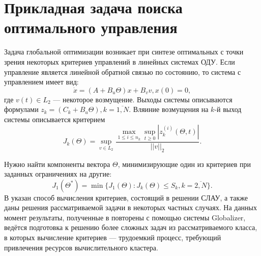 \section{Прикладная задача поиска оптимального управления}
Задача глобальной оптимизации возникает при синтезе оптимальных с точки зрения некоторых
критериев управлений в линейных системах ОДУ. Если управление является линейной обратной
связью по состоянию, то система с управлением имеет вид:
\begin{displaymath}
    \dot x = (A+B_u\Theta)x + B_v v, x(0)=0,
\end{displaymath}
где  \(v(t)\in L_2\) --- некоторое возмущение.
Выходы системы описываются формулами \(z_k=(C_k+B_u\Theta),k=\overline{1,N}\).
Вляиние возмущения на \(k\)-й выход системы описывается критерием
\begin{displaymath}
  J_k(\Theta)=\sup_{v\in L_2} \frac{\max_{1\le i \le n_k} \sup_{t\ge 0}|z_k^{(i)}(\Theta,t)|}{||v||_2}.
\end{displaymath}

Нужно найти компоненты вектора \(\Theta\), минимизирующие один из критериев при
заданных ограничениях на другие:
\begin{displaymath}
   J_1(\Theta^*)=\min\{J_1(\Theta):J_k(\Theta)\le S_k,k=\overline{2,N}\}.
\end{displaymath}
В \cite{optControl} указан способ вычисления критериев, состоящий в решении СЛАУ,
а также даны решения рассматриваемой задачи в некоторых частных случаях. На
данных момент результаты, полученные в \cite{optControl} повторены с помощью системы Globalizer,
ведётся подготовка к решению более сложных задач из рассматриваемого класса, в которых
вычисление критериев --- трудоемкий процесс, требующий привлечения ресурсов вычислительного кластера.

